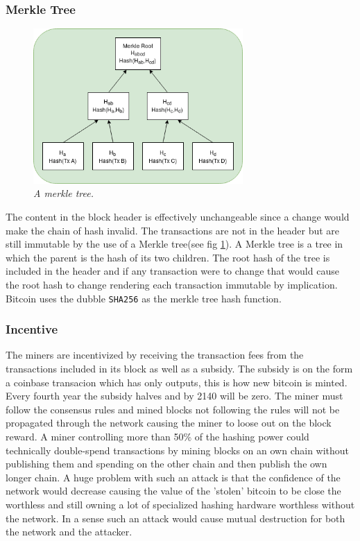\subsubsection{Merkle Tree}

\begin{figure}[!htb]
	
	\centering
	\includegraphics[width=8cm]{merkle.png}
	\caption{\textit{A merkle tree. 
	}}
	\label{fig:merkle:tree}
	
\end{figure}

The content in the block header is effectively unchangeable since a change would make the chain of hash invalid. The transactions are not in the header but are still immutable by the use of a Merkle tree(see fig \ref{fig:merkle:tree}). A Merkle tree is a tree in which the parent is the hash of its two children. The root hash of the tree is included in the header and if any transaction were to change that would cause the root hash to change rendering each transaction immutable by implication. Bitcoin uses the dubble \texttt{SHA256} as the merkle tree hash function.

\subsubsection{Incentive}

The miners are incentivized by receiving the transaction fees from the transactions included in its block as well as a subsidy. The subsidy is on the form a coinbase transacion which has only outputs, this is how new bitcoin is minted. Every fourth year the subsidy halves and by 2140 will be zero. The miner must follow the consensus rules and mined blocks not following the rules will not be propagated through the network causing the miner to loose out on the block reward. A miner controlling more than 50\% of the hashing power could technically double-spend transactions by mining blocks on an own chain without publishing them and spending on the other chain and then publish the own longer chain. A huge problem with such an attack is that the confidence of the network would decrease causing the value of the 'stolen' bitcoin to be close the worthless and still owning a lot of specialized hashing hardware worthless without the network. In a sense such an attack would cause mutual destruction for both the network and the attacker. 

